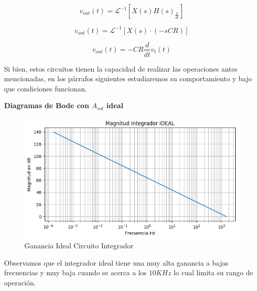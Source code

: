 $$v_{out}(t) = \mathcal{L}^{-1}[X(s)H(s)_{\frac{d}{dt}}]$$

$$v_{out}(t) = \mathcal{L}^{-1}[X(s)\cdot (-sCR)]$$

$$v_{out}(t)= -CR \frac{d}{dt}v_t(t)$$       

Si bien, estos circuitos tienen la capacidad de realizar las operaciones antes mencionadas, en los párrafos siguientes estudiaremos su comportamiento y bajo que condiciones funcionan.

\textbf{Diagramas de Bode con $A_{vol}$ ideal}\\
\begin{figure}[H]
	\centering
	\includegraphics[width=\textwidth]{Ejercicio4/BODE-IDEAL-MAGNITUD-INTEGRADOR.png}
	\caption{Ganancia Ideal Circuito Integrador}
\end{figure}

Observamos que el integrador ideal tiene una muy alta ganancia a bajas frecuencias y muy baja cuando se acerca a los $10KHz$ lo cual limita su rango de operación.

